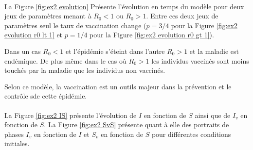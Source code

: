\documentclass[11pt]{article}
\begin{document}
\paragraph{} 
La Figure \ref{fig:ex2 evolution} Pr\'esente l'\'evolution en temps du mod\`ele pour deux jeux de param\`etres menant \`a $R_0 < 1$ ou  $R_0 > 1$. Entre ces deux jeux de param\`etres seul le taux de vaccination change ($p = 3/4$ pour la Figure \ref{fig:ex2 evolution r0 lt 1} et $p = 1/4$ pour la Figure \ref{fig:ex2 evolution r0 gt 1}).

 Dans un cas $R_0 <1$ et l'\'epid\'emie s'\'eteint dans l'autre $R_0 >1$ et la maladie est end\'emique. De plus m\^eme dans le cas o\`u $R_0 >1$ les individus vaccin\'es sont moins touch\'es par la maladie que les individus non vaccin\'es. 

Selon ce mod\`ele, la vaccination est un outils majeur dans la pr\'evention et le contr\^ole sde cette \'epid\'emie.


\paragraph{}
La Figure \ref{fig:ex2 IS} pr\'esente l'\'evolution de $I$ en fonction de $S$ ainsi que de $I_v$ en fonction de $S$. La Figure \ref{fig:ex2 SvS} pr\'esente quant \`a elle des portraits de phases $I_v$ en fonction de $I$ et $S_v$ en fonction de $S$ pour diff\'erentes conditions initiales.
\end{document}
